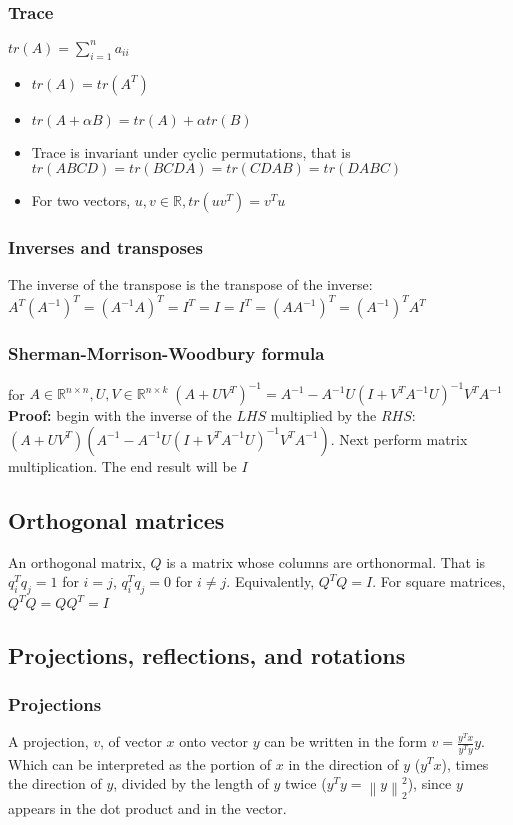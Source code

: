 \documentclass{article}
\newcommand{\norm}[2]{\left\lVert#1\right\rVert_#2}
\begin{document}
\subsubsection{Trace}
$tr(A) = \sum_{i = 1}^n a_{ii}$
\begin{itemize}
    \item $tr(A) = tr(A^T)$
    \item $tr(A + \alpha B) = tr(A) + \alpha tr(B)$
    \item Trace is invariant under cyclic permutations, that is $tr(ABCD) = tr(BCDA) = tr(CDAB) = tr(DABC)$
    \item For two vectors, $u, v \in \mathbb{R}, tr(uv^T) = v^Tu$
\end{itemize}

\subsubsection{Inverses and transposes}
The inverse of the transpose is the transpose of the inverse: $A^T(A^{-1})^T = (A^{-1}A)^T = I^T = I = I^T = (AA^{-1})^T = (A^{-1})^TA^T$

\subsubsection{Sherman-Morrison-Woodbury formula} 
for $A\in \mathbb{R}^{n\times n}, U,V \in \mathbb{R}^{n\times k} \; (A+UV^T)^{-1} = A^{-1} - A^{-1}U(I+V^TA^{-1}U)^{-1}V^TA^{-1}$\\
\textbf{Proof:} begin with the inverse of the $LHS$ multiplied by the $RHS$: $(A+UV^T) (A^{-1} - A^{-1}U(I+V^TA^{-1}U)^{-1}V^TA^{-1})$. Next perform matrix multiplication. The end result will be $I$


\subsection{Orthogonal matrices}
An orthogonal matrix, $Q$ is a matrix whose columns are orthonormal. That is $q_i^Tq_j = 1$ for $i=j$, $q_i^Tq_j = 0$ for $i\neq j$. Equivalently, $Q^TQ = I$. For square matrices, $Q^TQ = QQ^T = I$

\subsection{Projections, reflections, and rotations}
\subsubsection{Projections}
A projection, $v$, of vector $x$ onto vector $y$ can be written in the form $v = \frac{y^Tx}{y^Ty}y$. Which can be interpreted as the portion of $x$ in the direction of $y$ ($y^Tx$), times the direction of $y$, divided by the length of $y$ twice ($y^Ty = \norm{y}{2}^2$), since $y$ appears in the dot product and in the vector.
\end{document}
